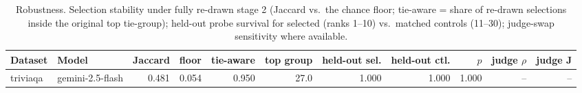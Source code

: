 \begin{table}[t]
\centering
\small
\begin{tabular}{llrrrrrrrrr}
\toprule
Dataset & Model & Jaccard & floor & tie-aware & top group & held-out sel. & held-out ctl. & $p$ & judge $\rho$ & judge J \\
\midrule
triviaqa & gemini-2.5-flash & 0.481 & 0.054 & 0.950 & 27.0 & 1.000 & 1.000 & 1.000 & -- & -- \\
\bottomrule
\end{tabular}
\caption{Robustness. Selection stability under fully re-drawn stage 2 (Jaccard vs.\ the chance floor; tie-aware = share of re-drawn selections inside the original top tie-group); held-out probe survival for selected (ranks 1--10) vs.\ matched controls (11--30); judge-swap sensitivity where available.}
\label{tab:robust}
\end{table}
